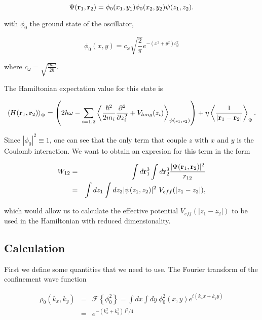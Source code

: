 \documentclass[a4paper,10pt]{article}
\begin{document}
\begin{equation}
\Psi(\mathbf{r}_1,\mathbf{r}_2) = \phi_0(x_1,y_1)\phi_0(x_2,y_2)\psi(z_1,z_2).
\end{equation}

with $\phi_0$ the ground state of the oscillator,

\begin{equation}
\phi_0(x,y)=c_{\omega}\sqrt{\frac{2}{\pi}}e^{-(x^2+y^2)c_{\omega}^2}
\end{equation}

\noindent where $c_{\omega}=\sqrt{\frac{m \omega}{2\hbar}}$.

The Hamiltonian expectation value for this state is

\begin{equation}
\label{emvh}
\left\langle H(\mathbf{r}_1, \mathbf{r}_2)\right\rangle_\Psi =
\left(2\hbar\omega -\sum_{i=1,2} \left\langle \frac{\hbar^2}{2
m_i}\frac{\partial^2}{\partial z_i^2}+ V_{long}(z_i)\right\rangle_{\psi(z_1,z_2)}\right)+\eta \left\langle\frac{1}{\left|\mathbf{r}_1-\mathbf{r}_2\right|}\right\rangle_\Psi.
\end{equation}

Since $|\phi_0|^2\equiv 1$, one can see that the only term that couple $z$ with $x$ and
$y$ is the Coulomb interaction. We want to obtain an expresion for this term in the form

\begin{eqnarray}\label{coulint}
W_{12}&=&\int d\mathbf{r}^3_1 \int d\mathbf{r}^3_2\frac{|\Psi(\mathbf{r}_1,\mathbf{r}_2)|^2}{r_{12}} \\
&=& \int dz_1\int dz_2 |\psi(z_1,z_2)|^2\ V_{eff}(|z_1-z_2|),
\end{eqnarray}

\noindent which would allow us to calculate the effective potential $V_{eff}(|z_1-z_2|)$
to be used in the Hamiltonian with reduced dimensionality.

\subsection*{Calculation}

First we define some quantities that we need to use. The Fourier transform of the
confinement wave function

\begin{eqnarray}
\rho_0(k_x,k_y)&=&\mathcal{F}\left\lbrace\phi^2_0\right\rbrace = \int
dx\int
dy\ \phi^2_0(x,y)e^{i(k_x x + k_y y)} \\
&=& e^{-(k_x^2+k_y^2)\ l^2/4}
\end{eqnarray}
\end{document}
